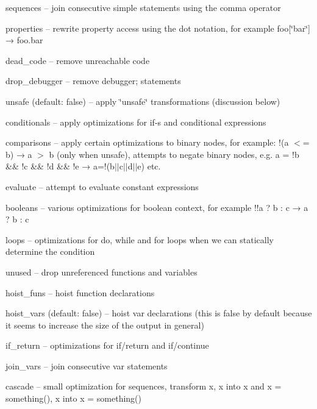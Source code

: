 \begin{DoxyItemize}
\item {\ttfamily sequences} -- join consecutive simple statements using the comma operator
\item {\ttfamily properties} -- rewrite property access using the dot notation, for example {\ttfamily foo\mbox{[}\char`\"{}bar\char`\"{}\mbox{]} → foo.\+bar}
\item {\ttfamily dead\+\_\+code} -- remove unreachable code
\item {\ttfamily drop\+\_\+debugger} -- remove {\ttfamily debugger;} statements
\item {\ttfamily unsafe} (default\+: false) -- apply \char`\"{}unsafe\char`\"{} transformations (discussion below)
\item {\ttfamily conditionals} -- apply optimizations for {\ttfamily if}-\/s and conditional expressions
\item {\ttfamily comparisons} -- apply certain optimizations to binary nodes, for example\+: {\ttfamily !(a $<$= b) → a $>$ b} (only when {\ttfamily unsafe}), attempts to negate binary nodes, e.\+g. {\ttfamily a = !b \&\& !c \&\& !d \&\& !e → a=!(b$\vert$$\vert$c$\vert$$\vert$d$\vert$$\vert$e)} etc.
\item {\ttfamily evaluate} -- attempt to evaluate constant expressions
\item {\ttfamily booleans} -- various optimizations for boolean context, for example {\ttfamily !!a ? b \+: c → a ? b \+: c}
\item {\ttfamily loops} -- optimizations for {\ttfamily do}, {\ttfamily while} and {\ttfamily for} loops when we can statically determine the condition
\item {\ttfamily unused} -- drop unreferenced functions and variables
\item {\ttfamily hoist\+\_\+funs} -- hoist function declarations
\item {\ttfamily hoist\+\_\+vars} (default\+: false) -- hoist {\ttfamily var} declarations (this is {\ttfamily false} by default because it seems to increase the size of the output in general)
\item {\ttfamily if\+\_\+return} -- optimizations for if/return and if/continue
\item {\ttfamily join\+\_\+vars} -- join consecutive {\ttfamily var} statements
\item {\ttfamily cascade} -- small optimization for sequences, transform {\ttfamily x, x} into {\ttfamily x} and {\ttfamily x = something(), x} into {\ttfamily x = something()}

\end{DoxyItemize}
